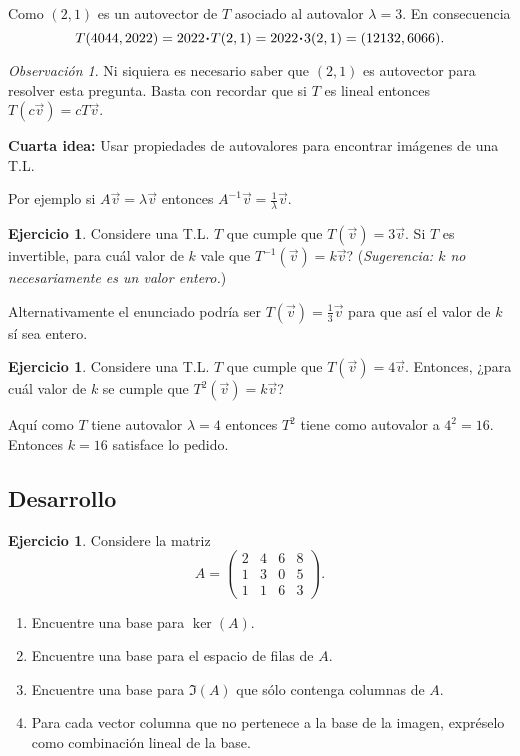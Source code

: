 \documentclass[12pt]{article}
\theoremstyle{plain}
\theoremstyle{definition}
\newtheorem{Ej}[Th]{Ejercicio}         %
\theoremstyle{remark}
\newtheorem*{Rmk}{Observación}      %
\newcommand{\la}{\lambda}           %
\renewcommand{\:}{\colon}           %
\renewcommand{\.}{\Cdot}                %
\begin{document}
Como $(2,1)$ es un autovector de $T$ asociado al autovalor $\la=3$. En consecuencia 
$$T(4044,2022)=2022\.T(2,1)=2022\.3(2,1)=(12132,6066).$$

\begin{Rmk}
  Ni siquiera es necesario saber que $(2,1)$ es autovector para resolver esta pregunta. Basta con recordar que si $T$ es lineal entonces $T(c\vec{v})=cT\vec{v}$.
\end{Rmk}

\textbf{Cuarta idea:} Usar propiedades de autovalores para encontrar imágenes de una T.L. 

Por ejemplo si $A\vec{v}=\la \vec{v}$ entonces $A^{-1}\vec{v}=\frac{1}{\la}\vec{v}$.

\begin{Ej}
  Considere una T.L. $T$ que cumple que $T(\vec{v})=3\vec{v}$. Si $T$ es invertible, para cuál valor de $k$ vale que $T^{-1}(\vec{v})=k\vec{v}$? (\emph{Sugerencia: $k$ no necesariamente es un valor entero.})
\end{Ej}

Alternativamente el enunciado podría ser $T(\vec{v})=\frac{1}{3}\vec{v}$ para que así el valor de $k$ sí sea entero.

\begin{Ej}
  Considere una T.L. $T$ que cumple que $T(\vec{v})=4\vec{v}$. Entonces, ¿para cuál valor de $k$ se cumple que $T^2(\vec{v})=k\vec{v}$?
\end{Ej}

Aquí como $T$ tiene autovalor $\la=4$ entonces $T^2$ tiene como autovalor a $4^2=16$. Entonces $k=16$ satisface lo pedido.
\newpage
\subsection*{Desarrollo}

\begin{Ej}
  Considere la matriz 
  $$A=\begin{pmatrix}
    2&4&6&8\\1&3&0&5\\1&1&6&3
  \end{pmatrix}.$$
\begin{enumerate}
  \item Encuentre una base para $\ker(A)$.
  \item Encuentre una base para el espacio de filas de $A$.
  \item Encuentre una base para $\Im(A)$ que sólo contenga columnas de $A$.
  \item Para cada vector columna que no pertenece a la base de la imagen, expréselo como combinación lineal de la base.
\end{enumerate}
\end{Ej}
\end{document}
